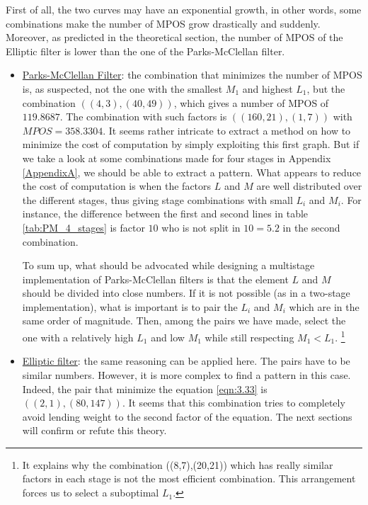 \newpage
First of all, the two curves may have an exponential growth, in other words, some combinations make the number of MPOS grow drastically and suddenly. Moreover, as predicted in the theoretical section, the number of MPOS of the Elliptic filter is lower than the one of the Parks-McClellan filter.

\begin{itemize}
	\item \underline{Parks-McClellan Filter}:  the combination that minimizes the number of MPOS is, as suspected, not the one with the smallest $M_1$ and highest $L_1$, but the combination $((4,3),(40,49))$, which gives a number of MPOS of $119.8687$. The combination with such factors is $((160,21),(1,7))$ with $MPOS = 358.3304$. It seems rather intricate to extract a method on how to minimize the cost of computation by simply exploiting this first graph. But if we take a look at some combinations made for four stages in Appendix \ref{AppendixA}, we should be able to extract a pattern. What appears to reduce the cost of computation is when the factors $L$ and $M$ are well distributed over the different stages, thus giving stage combinations with small $L_i$ and $M_i$. For instance, the difference between the first and second lines in table \ref{tab:PM_4_stages} is factor $10$ who is not split in $10 = 5.2$ in the second combination. 
	
	To sum up, what should be advocated while designing a multistage implementation of Parks-McClellan filters is that the element $L$ and $M$ should be divided into close numbers. If it is not possible (as in a two-stage implementation), what is important is to pair the $L_i$ and $M_i$ which are in the same order of magnitude. Then, among the pairs we have made, select the one with a relatively high $L_1$ and low $M_1$ while still respecting $M_1 < L_1$. \footnote{It explains why the combination ((8,7),(20,21)) which has really similar factors in each stage is not the most efficient combination. This arrangement forces us to select a suboptimal $L_1$.}
	
	
	\item \underline{Elliptic filter}: the same reasoning can be applied here. The pairs have to be similar numbers. However, it is more complex to find a pattern in this case. Indeed, the pair that minimize the equation \ref{eqn:3.33} is $((2,1),(80,147))$. It seems that this combination tries to completely avoid lending weight to the second factor of the equation. The next sections will confirm or refute this theory. 
\end{itemize}


